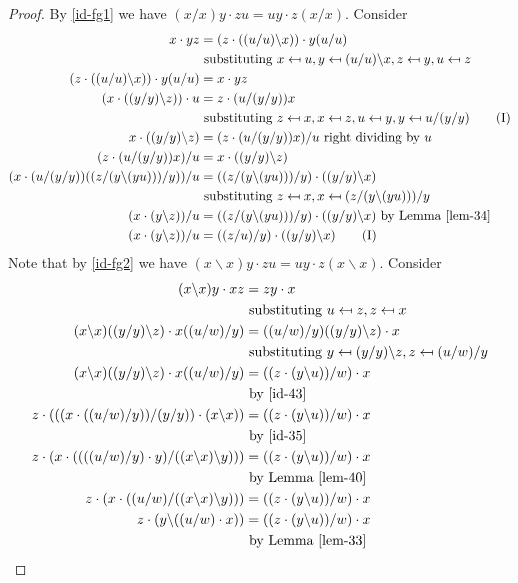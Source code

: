 \documentclass[12pt, twoside, openright]{report}
\theoremstyle{definition}
\newcommand{\ldv}{\backslash}       %
\newcommand{\rdv}{/}                %
\begin{document}
\begin{proof}
  By \ref{id-fg1} we have $(x\rdv x)y\cdot zu = uy \cdot z(x\rdv x)$. Consider
  \begin{align*}
    x\cdot yz &= (z\cdot ((u\rdv u)\ldv x))\cdot y(u\rdv u)\\
    &\text{ substituting $x\mapsfrom u, y\mapsfrom (u\rdv u)\ldv x, z\mapsfrom y, u\mapsfrom z$}\\
    (z\cdot ((u\rdv u)\ldv x))\cdot y(u\rdv u) &= x\cdot yz\\
    (x\cdot((y\rdv y)\ldv z))\cdot u &= z\cdot (u\rdv(y\rdv y))x\\
    &\text{ substituting
      $z\mapsfrom x, x\mapsfrom z, u\mapsfrom y, y\mapsfrom u\rdv(y\rdv y)$}\label{id-35} \tag{I}\\
    x\cdot ((y\rdv y)\ldv z) &= (z\cdot (u\rdv (y\rdv y))x)\rdv u\text{ right dividing by $u$}\\
    (z\cdot (u\rdv (y\rdv y))x)\rdv u &= x\cdot ((y\rdv y)\ldv z)\\
    (x\cdot (u\rdv (y\rdv y))((z\rdv (y\ldv (yu)))\rdv y))\rdv u &=
      ((z\rdv (y\ldv (yu)))\rdv y)\cdot ((y\rdv y)\ldv x)\\
    &\text{ substituting $z\mapsfrom x, x\mapsfrom (z\rdv (y\ldv(yu)))\rdv y$}\\
    (x\cdot (y\ldv z))\rdv u &= ((z\rdv (y\ldv (yu)))\rdv y)\cdot ((y\rdv y)\ldv x)
      \text{ by Lemma \ref{lem-34}}\\
    (x\cdot (y\ldv z))\rdv u &= ((z\rdv u)\rdv y)\cdot ((y\rdv y)\ldv x)\label{id-43} \tag{I}
  \end{align*}
  Note that by \ref{id-fg2} we have $(x\ldv x)y\cdot zu = uy\cdot z(x\ldv x)$.
    Consider
  \begin{align*}
    (x\ldv x)y\cdot xz &= zy\cdot x\\
      &\text{ substituting $u\mapsfrom z, z\mapsfrom x$}\\
    (x\ldv x)((y\rdv y)\ldv z)\cdot x((u\rdv w)\rdv y) &=
      ((u\rdv w)\rdv y)((y\rdv y)\ldv z)\cdot x\\
    &\text{ substituting $y\mapsfrom (y\rdv y)\ldv z, z\mapsfrom (u\rdv w)\rdv y$}\\
    (x\ldv x)((y\rdv y)\ldv z)\cdot x((u\rdv w)\rdv y) &= ((z\cdot (y\ldv u))\rdv w)\cdot x\\
      &\text{ by \ref{id-43}}\\
    z\cdot (((x\cdot ((u\rdv w)\rdv y))\rdv (y\rdv y))\cdot (x\ldv x)) &=
      ((z\cdot (y\ldv u))\rdv w)\cdot x\\
      &\text{ by \ref{id-35}}\\
    z\cdot (x\cdot ((((u\rdv w)\rdv y)\cdot y)\rdv ((x\ldv x)\ldv y))) &=
      ((z\cdot (y\ldv u))\rdv w)\cdot x\\
      &\text{ by Lemma \ref{lem-40}}\\
    z\cdot (x\cdot ((u\rdv w)\rdv ((x\ldv x)\ldv y))) &=
      ((z\cdot (y\ldv u))\rdv w)\cdot x\\
    z\cdot (y\ldv ((u\rdv w)\cdot x)) &= ((z\cdot (y\ldv u))\rdv w)\cdot x\\
      &\text{ by Lemma \ref{lem-33}}
  \end{align*}
\end{proof}
\end{document}
